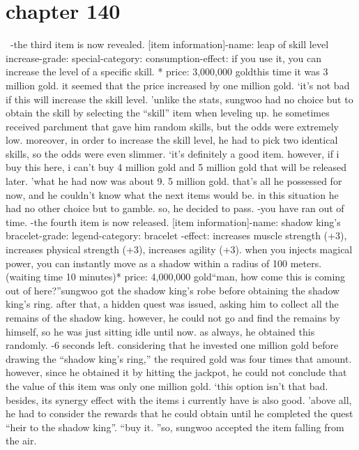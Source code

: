 \section{chapter 140}






 -the third item is now revealed.
[item information]-name: leap of skill level increase-grade: special-category: consumption-effect: if you use it, you can increase the level of a specific skill.
* price: 3,000,000 goldthis time it was 3 million gold.
 it seemed that the price increased by one million gold.
‘it’s not bad if this will increase the skill level.
’unlike the stats, sungwoo had no choice but to obtain the skill by selecting the “skill” item when leveling up.
 he sometimes received parchment that gave him random skills, but the odds were extremely low.
moreover, in order to increase the skill level, he had to pick two identical skills, so the odds were even slimmer.
‘it’s definitely a good item.
 however, if i buy this here, i can’t buy 4 million gold and 5 million gold that will be released later.
’what he had now was about 9.
5 million gold.
 that’s all he possessed for now, and he couldn’t know what the next items would be.
 in this situation he had no other choice but to gamble.
so, he decided to pass.
-you have ran out of time.
-the fourth item is now released.
[item information]-name: shadow king’s bracelet-grade: legend-category: bracelet
-effect: increases muscle strength (+3), increases physical strength (+3), increases agility (+3).
 when you injects magical power, you can instantly move as a shadow within a radius of 100 meters.
 (waiting time 10 minutes)* price: 4,000,000 gold“man, how come this is coming out of here?”sungwoo got the shadow king’s robe before obtaining the shadow king’s ring.
 after that, a hidden quest was issued, asking him to collect all the remains of the shadow king.
however, he could not go and find the remains by himself, so he was just sitting idle until now.
 as always, he obtained this randomly.
-6 seconds left.
considering that he invested one million gold before drawing the “shadow king’s ring,” the required gold was four times that amount.
 however, since he obtained it by hitting the jackpot, he could not conclude that the value of this item was only one million gold.
‘this option isn’t that bad.
 besides, its synergy effect with the items i currently have is also good.
’above all, he had to consider the rewards that he could obtain until he completed the quest “heir to the shadow king”.
“buy it.
”so, sungwoo accepted the item falling from the air.
